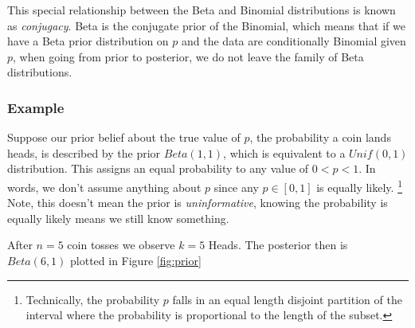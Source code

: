 This special relationship between the Beta and Binomial distributions is known as \emph{conjugacy}. 
Beta is the conjugate prior of the Binomial, 
which means that if we have a Beta prior distribution on \(p\) 
and the data are conditionally Binomial given \(p\), 
when going from prior to posterior, 
we do not leave the family of Beta distributions.

\subsubsection{Example}

Suppose our prior belief about the true value of \(p\), 
the probability a coin lands heads, 
is described by the prior \(Beta(1,1)\), 
which is equivalent to a \(Unif(0,1)\) distribution. 
This assigns an equal probability to any value of \(0<p<1.\) 
In words, 
we don't assume anything about \(p\) since any \(p \in [0,1]\) is 
equally likely.%
\footnote{Technically, 
the probability \(p\) falls in an equal length disjoint partition of the interval where 
the probability is proportional to the length of the subset.}
Note, 
this doesn't mean the prior is \emph{uninformative}, 
knowing the probability is equally likely means we still know something.

After \(n = 5\) coin tosses we observe \(k = 5\) Heads. 
The posterior then is \(Beta(6,1)\) plotted in Figure \ref{fig:prior}

